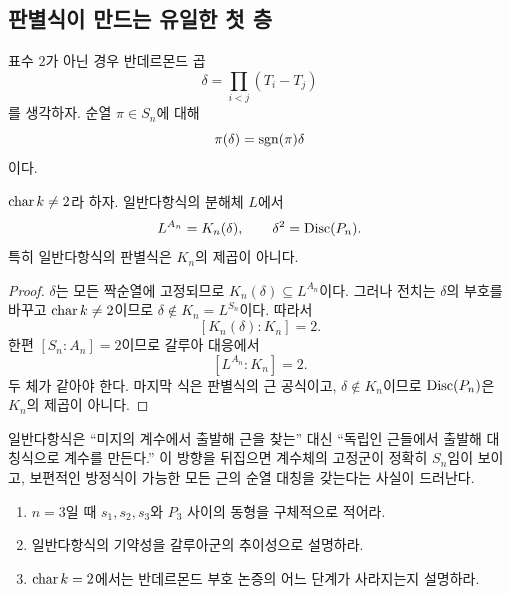 \subsection{판별식이 만드는 유일한 첫 층}

표수 $2$가 아닌 경우 반데르몬드 곱
\[
  \delta=\prod_{i<j}(T_i-T_j)
\]
를 생각하자. 순열 $\pi\in S_n$에 대해
\[
  \pi(\delta)=\operatorname{sgn}(\pi)\delta
\]
이다.

\begin{proposition}
\label{prop:generic-an-fixed-field}
$\operatorname{char} k\ne2$라 하자. 일반다항식의 분해체 $L$에서
\[
  L^{A_n}=K_n(\delta),
  \qquad
  \delta^2=\operatorname{Disc}(P_n).
\]
특히 일반다항식의 판별식은 $K_n$의 제곱이 아니다.
\end{proposition}

\begin{proof}
$\delta$는 모든 짝순열에 고정되므로 $K_n(\delta)\subseteq L^{A_n}$이다. 그러나 전치는 $\delta$의 부호를 바꾸고 $\operatorname{char} k\ne2$이므로 $\delta\notin K_n=L^{S_n}$이다. 따라서
\[
  [K_n(\delta):K_n]=2.
\]
한편 $[S_n:A_n]=2$이므로 갈루아 대응에서
\[
  [L^{A_n}:K_n]=2.
\]
두 체가 같아야 한다. 마지막 식은 판별식의 근 공식이고, $\delta\notin K_n$이므로 $\operatorname{Disc}(P_n)$은 $K_n$의 제곱이 아니다.
\end{proof}

\begin{keyidea}
일반다항식은 ``미지의 계수에서 출발해 근을 찾는'' 대신 ``독립인 근들에서 출발해 대칭식으로 계수를 만든다.'' 이 방향을 뒤집으면 계수체의 고정군이 정확히 $S_n$임이 보이고, 보편적인 방정식이 가능한 모든 근의 순열 대칭을 갖는다는 사실이 드러난다.
\end{keyidea}

\begin{checkpoint}
\begin{enumerate}[label=(\alph*)]
  \item $n=3$일 때 $s_1,s_2,s_3$와 $P_3$ 사이의 동형을 구체적으로 적어라.
  \item 일반다항식의 기약성을 갈루아군의 추이성으로 설명하라.
  \item $\operatorname{char} k=2$에서는 반데르몬드 부호 논증의 어느 단계가 사라지는지 설명하라.
\end{enumerate}
\end{checkpoint}
